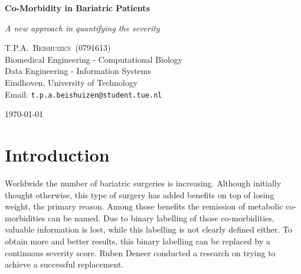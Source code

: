 \documentclass[10pt,a4paper]{article}
\newcommand{\documenttitle}{Co-Morbidity in Bariatric Patients}
\newcommand{\documentsubtitle}{A new approach in quantifying the severity}
\begin{document}
	
	\begin{titlepage}
		
		\center
		
		\vspace*{3cm}
		
		\textbf{\huge \documenttitle}
		
		\textit{\LARGE \documentsubtitle}
		
		\vspace*{2cm}
		
		\large
		\centering
		T.P.A.~\textsc{Beishuizen}~(0791613)\\
		Biomedical Engineering - Computational Biology\\
		Data Engineering - Information Systems\\
		Eindhoven, University of Technology\\
		Email: \texttt{t.p.a.beishuizen@student.tue.nl}
		
		\vfill
		
		\vspace*{1cm}
		
		\today
		
	\end{titlepage}
	
	\tableofcontents
	
	
	\pagestyle{fancy}
	\fancyhead{} %
	\fancyfoot{} %
	\renewcommand{\headrulewidth}{0.4pt}
	\renewcommand{\footrulewidth}{0.4pt}
	
	\clearpage
	
	\section{Introduction}
	\label{sec:Intro}
	
	Worldwide the number of bariatric surgeries is increasing. Although initially thought otherwise, this type of surgery has added benefits on top of losing weight, the primary reason. Among those benefits the remission of metabolic co-morbidities can be named. Due to binary labelling of those co-morbidities, valuable information is lost, while this labelling is not clearly defined either. To obtain more and better results, this binary labelling can be replaced by a continuous severity score. Ruben Deneer conducted a research on trying to achieve a successful replacement.\cite{Deneer2017Thesis}
	
\end{document}
